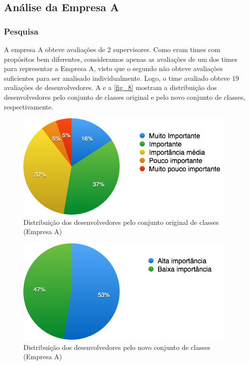 \subsection{Análise da Empresa A}

\subsubsection{Pesquisa}

A empresa A obteve avaliações de 2 supervisores. Como eram times com propósitos bem diferentes, consideramos apenas as avaliações de um dos times para representar a Empresa A, visto que o segundo não obteve avaliações suficientes para ser analisado individualmente. Logo, o time avaliado obteve 19 avaliações de desenvolvedores. A  e a \autoref{fig_8} mostram a distribuição dos desenvolvedores pelo conjunto de classes original e pelo novo conjunto de classes, respectivamente.


\begin{figure}[p]
	\centering
	\includegraphics[width=\textwidth]{figs/empresa_a/imagem-classe-original.png}
	\caption{\label{fig_7}Distribuição dos desenvolvedores pelo conjunto original de classes (Empresa A)}
\end{figure}

\begin{figure}[p]
	\centering
	\includegraphics[width=\textwidth]{figs/empresa_a/imagem-classe-alternativa.png}
	\caption{\label{fig_8}Distribuição dos desenvolvedores pelo novo conjunto de classes (Empresa A)}
\end{figure}

